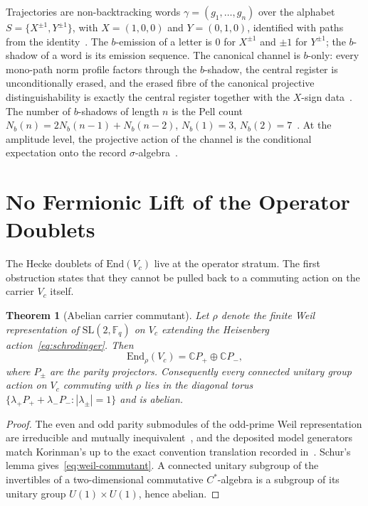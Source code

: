 \documentclass[11pt,a4paper]{article}
\newtheorem{theorem}{Theorem}[section]
\theoremstyle{definition}
\theoremstyle{remark}
\newcommand{\C}{\mathbb{C}}
\newcommand{\Fq}{\mathbb{F}_q}
\newcommand{\G}{\mathrm{SL}(2,\Fq)}
\newcommand{\End}{\mathrm{End}}
\newcommand{\Vc}{V_{c}}
\begin{document}
Trajectories are non-backtracking words $\gamma=(g_1,\dots,g_n)$ over the alphabet
$S=\{X^{\pm1},Y^{\pm1}\}$, with $X=(1,0,0)$ and $Y=(0,1,0)$, identified with paths from
the identity~\cite{Beau2026tb}.
The $b$-emission of a letter is $0$ for $X^{\pm1}$ and $\pm1$ for $Y^{\pm1}$; the
$b$-shadow of a word is its emission sequence.
The canonical channel is $b$-only: every mono-path norm profile factors through the
$b$-shadow, the central register is unconditionally erased, and the erased fibre of the
canonical projective distinguishability is exactly the central register together with the
$X$-sign data~\cite{Beau2026tb}.
The number of $b$-shadows of length $n$ is the Pell count
$N_b(n)=2N_b(n-1)+N_b(n-2)$, $N_b(1)=3$, $N_b(2)=7$~\cite{Beau2026tb}.
At the amplitude level, the projective action of the channel is the conditional
expectation onto the record $\sigma$-algebra~\cite{Beau2026pce}.

\section{No Fermionic Lift of the Operator Doublets}
\label{sec:no-lift}

The Hecke doublets of $\End(\Vc)$ live at the operator stratum.
The first obstruction states that they cannot be pulled back to a commuting action on the
carrier $\Vc$ itself.

\begin{theorem}[Abelian carrier commutant]
  \label{thm:abelian-commutant}
  Let $\rho$ denote the finite Weil representation of $\G$ on $\Vc$ extending the
  Heisenberg action~\eqref{eq:schrodinger}.
  Then
  \begin{equation}
    \End_{\rho}(\Vc)=\C P_+\oplus\C P_-,
    \label{eq:weil-commutant}
  \end{equation}
  where $P_\pm$ are the parity projectors.
  Consequently every connected unitary group action on $\Vc$ commuting with $\rho$ lies
  in the diagonal torus $\{\lambda_+P_++\lambda_-P_-:|\lambda_\pm|=1\}$ and is abelian.
\end{theorem}

\begin{proof}
  The even and odd parity submodules of the odd-prime Weil representation are
  irreducible and mutually inequivalent~\cite{Korinman2013}, and the deposited model
  generators match Korinman's up to the exact convention translation recorded
  in~\cite{Beau2026a37}.
  Schur's lemma gives~\eqref{eq:weil-commutant}.
  A connected unitary subgroup of the invertibles of a two-dimensional commutative
  $C^*$-algebra is a subgroup of its unitary group $U(1)\times U(1)$, hence abelian.
\end{proof}
\end{document}
